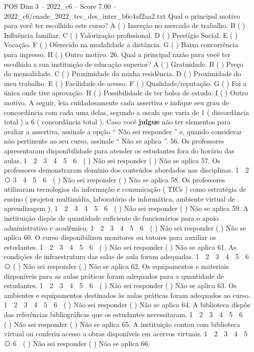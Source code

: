 \begin{textsample}{POS Dim 3 – 2022\_c6 – Score 7.00 – 2022\_c6/enade\_2022\_tec\_des\_inter\_b6c4af2aa2.txt}
Qual o principal motivo para você ter escolhido este curso?
A ( ) Inserção no mercado de trabalho.
B ( ) Influência familiar.
C ( ) Valorização profissional.
D ( ) Prestígio Social.
E ( ) Vocação.
F ( ) Oferecido na modalidade a distância.
G ( ) Baixa concorrência para ingresso.
H ( ) Outro motivo. 26.
Qual a principal razão para você ter escolhido a sua instituição de educação superior?
A ( ) Gratuidade.
B ( ) Preço da mensalidade.
C ( ) Proximidade da minha residência.
D ( ) Proximidade do meu trabalho.
E ( ) Facilidade de acesso.
F ( ) Qualidade/reputação.
G ( ) Foi a única onde tive aprovação.
H ( ) Possibilidade de ter bolsa de estudo.
I ( ) Outro motivo.
A seguir, leia cuidadosamente cada assertiva e indique seu grau de concordância com cada uma delas, segundo a escala que varia de 1 ( discordância total ) a 6 ( concordância total ).
Caso você \textbf{julgue} não ter elementos para avaliar a assertiva, assinale a opção “ Não sei responder ” e, quando considerar não pertinente ao seu curso, assinale “ Não se aplica ”. 56.
Os professores apresentaram disponibilidade para atender os estudantes fora do horário das aulas. 1 ⃝ 2 ⃝ 3 ⃝ 4 ⃝ 5 ⃝ 6 ⃝ ( ) Não sei responder ( ) Não se aplica 57.
Os professores demonstraram domínio dos conteúdos abordados nas disciplinas. 1 ⃝ 2 ⃝ 3 ⃝ 4 ⃝ 5 ⃝ 6 ⃝ ( ) Não sei responder ( ) Não se aplica 58.
Os professores utilizaram tecnologias da informação e comunicação ( TICs ) como estratégia de ensino ( projetor multimídia, laboratório de informática, ambiente virtual de aprendizagem ). 1 ⃝ 2 ⃝ 3 ⃝ 4 ⃝ 5 ⃝ 6 ⃝ ( ) Não sei responder ( ) Não se aplica 59.
A instituição dispôs de quantidade suficiente de funcionários para o apoio administrativo e acadêmico. 1 ⃝ 2 ⃝ 3 ⃝ 4 ⃝ 5 ⃝ 6 ⃝ ( ) Não sei responder ( ) Não se aplica 60.
O curso disponibilizou monitores ou tutores para auxiliar os estudantes. 1 ⃝ 2 ⃝ 3 ⃝ 4 ⃝ 5 ⃝ 6 ⃝ ( ) Não sei responder ( ) Não se aplica 61.
As condições de infraestrutura das salas de aula foram adequadas. 1 ⃝ 2 ⃝ 3 ⃝ 4 ⃝ 5 ⃝ 6 ⃝ ( ) Não sei responder ( ) Não se aplica 62.
Os equipamentos e materiais disponíveis para as aulas práticas foram adequados para a quantidade de estudantes. 1 ⃝ 2 ⃝ 3 ⃝ 4 ⃝ 5 ⃝ 6 ⃝ ( ) Não sei responder ( ) Não se aplica 63.
Os ambientes e equipamentos destinados às aulas práticas foram adequados ao curso. 1 ⃝ 2 ⃝ 3 ⃝ 4 ⃝ 5 ⃝ 6 ⃝ ( ) Não sei responder ( ) Não se aplica 64.
A biblioteca dispôs das referências bibliográficas que os estudantes necessitaram. 1 ⃝ 2 ⃝ 3 ⃝ 4 ⃝ 5 ⃝ 6 ⃝ ( ) Não sei responder ( ) Não se aplica 65.
A instituição contou com biblioteca virtual ou conferiu acesso a obras disponíveis em acervos virtuais. 1 ⃝ 2 ⃝ 3 ⃝ 4 ⃝ 5 ⃝ 6 ⃝ ( ) Não sei responder ( ) Não se aplica 66.

\end{textsample}

